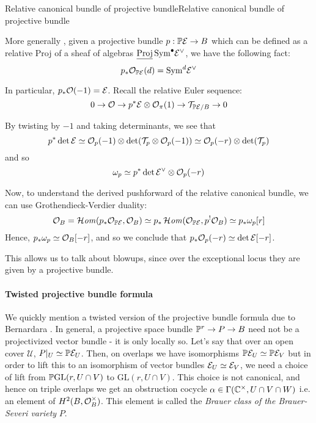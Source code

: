 \begin{remark}{Relative canonical bundle of projective bundle}{Relative canonical bundle of projective bundle}

        More generally \cite[Remark~13.36]{Wedhorn}, given a projective bundle $p:\P\calE \rightarrow B$ which can be defined as a relative Proj of a sheaf of algebras $\underline{\Proj}\, \mathrm{Sym}^\bullet \calE^\vee$, we have the following fact: $$p_* \O_{\P\calE}(d)=\mathrm{Sym}^d \calE^\vee$$ 
    
        In particular, $p_*\O(-1)=\calE$. Recall the relative Euler sequence: $$0\rightarrow \O\rightarrow p^* \calE \otimes \O_{\pi}(1)\rightarrow \calT_{\P\calE/B}\rightarrow 0$$
    
        By twisting by $-1$ and taking determinants, we see that $$p^* \det \calE \simeq \O_p(-1) \otimes \det(\calT_p\otimes \O_p(-1))\simeq \O_p(-r) \otimes \det(\calT_p)$$and so $$\omega_p\simeq p^* \det \calE^\vee \otimes \O_{p}(-r)$$
    
        Now, to understand the derived pushforward of the relative canonical bundle, we can use Grothendieck-Verdier duality: $$\O_B=\lHom (p_* \O_{\P\calE}, \O_B)\simeq p_* \lHom(\O_{\P\calE}, p^!\O_B)\simeq p_* \omega_p[r]$$
        Hence,  $p_* \omega_p\simeq \O_B[-r]$, and so we conclude that $p_* \O_p(-r) \simeq \det \calE[-r]$. 
\end{remark}

This allows us to talk about blowups, since over the exceptional locus they are given by a projective bundle.

\paragraph*{Twisted projective bundle formula}\label{Twisted projective bundle formula}
We quickly mention a twisted version of the projective bundle formula due to Bernardara \cite{bernardara_semiorthogonal_2005}. In general, a projective space bundle $\P^r \rightarrow P\rightarrow B$ need not be a projectivized vector bundle - it is only locally so. Let's say that over an open cover $\mathcal{U}$, $P|_U\simeq \P \calE_U$. Then, on overlaps we have isomorphisms $\P\calE_U \simeq \P \calE_V$ but in order to lift this to an isomorphism of vector bundles $\calE_U \simeq \calE_V$, we need a choice of lift from $\P\mathrm{GL}(r,U\cap V)$ to $\mathrm{GL}(r,U\cap V)$. This choice is not canonical, and hence on triple overlaps we get an obstruction cocycle $\alpha \in \Gamma(\C^\times, U\cap V \cap W)$ i.e. an element of $H^2(B,\O_B^\times)$. This element is called the \emph{Brauer class of the Brauer-Severi variety }$P$.

